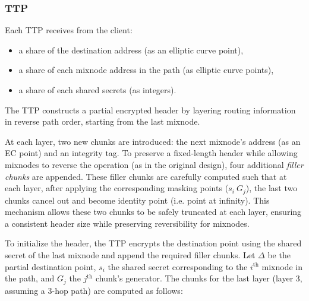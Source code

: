 \subsubsection{TTP}
Each TTP receives from the client:
\begin{itemize}
    \item a share of the destination address (as an elliptic curve point),
    \item a share of each mixnode address in the path (as elliptic curve points),
    \item a share of each shared secrets (as integers).
\end{itemize}

The TTP constructs a partial encrypted header by layering routing information in reverse path order, starting from the last mixnode.

At each layer, two new chunks are introduced: the next mixnode’s address (as an EC point) and an integrity tag.  
To preserve a fixed-length header while allowing mixnodes to reverse the operation (as in the original design), four additional \emph{filler chunks} are appended.  
These filler chunks are carefully computed such that at each layer, after applying the corresponding masking points ($s_i \ G_j$), the last two chunks cancel out and become identity point (i.e. point at infinity).  
This mechanism allows these two chunks to be safely truncated at each layer, ensuring a consistent header size while preserving reversibility for mixnodes.

To initialize the header, the TTP encrypts the destination point using the shared secret of the last mixnode and append the required filler chunks. 
Let $ \Delta $ be the partial destination point, $ s_i $ the shared secret corresponding to the $ i^\text{th} $ mixnode in the path, and $ G_j $ the $ j^\text{th} $ chunk's generator. 
The chunks for the last layer (layer 3, assuming a 3-hop path) are computed as follows:

